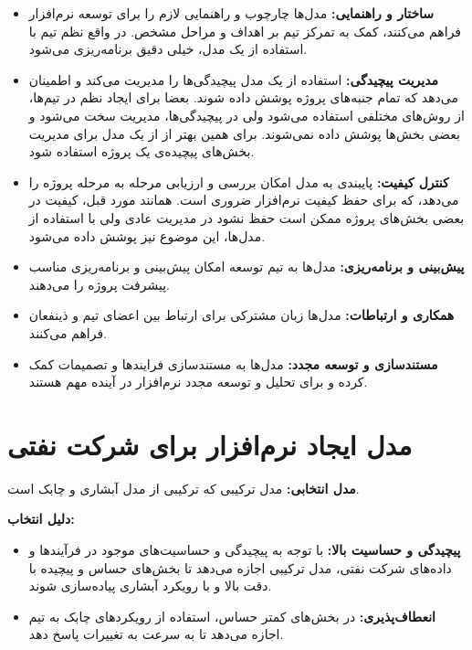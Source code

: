 \begin{itemize}
	\item \textbf{ساختار و راهنمایی:}
	مدل‌ها چارچوب و راهنمایی لازم را برای توسعه نرم‌افزار فراهم می‌کنند، کمک به تمرکز تیم بر اهداف و مراحل مشخص. در واقع نظم تیم با استفاده از یک مدل، خیلی دقیق برنامه‌ریزی می‌شود.
	\item \textbf{مدیریت پیچیدگی:}
	استفاده از یک مدل پیچیدگی‌ها را مدیریت می‌کند و اطمینان می‌دهد که تمام جنبه‌های پروژه پوشش داده شوند. بعضا برای ایجاد نظم در تیم‌ها، از روش‌های مختلفی استفاده می‌شود ولی در پیچیدگی‌ها، مدیریت سخت می‌شود و بعضی بخش‌ها پوشش داده نمی‌شوند. برای همین بهتر از از یک مدل برای مدیریت بخش‌های پیچیده‌ی یک پروژه استفاده شود.
	\item \textbf{کنترل کیفیت:}
	پایبندی به مدل امکان بررسی و ارزیابی مرحله به مرحله پروژه را می‌دهد، که برای حفظ کیفیت نرم‌افزار ضروری است. همانند مورد قبل، کیفیت در بعضی بخش‌های پروژه ممکن است حفظ نشود در مدیریت عادی ولی با استفاده از مدل‌ها، این موضوع نیز پوشش داده می‌شود.
	\item \textbf{پیش‌بینی و برنامه‌ریزی:}
	مدل‌ها به تیم توسعه امکان پیش‌بینی و برنامه‌ریزی مناسب پیشرفت پروژه را می‌دهند.
	\item \textbf{همکاری و ارتباطات:}
	مدل‌ها زبان مشترکی برای ارتباط بین اعضای تیم و ذینفعان فراهم می‌کنند.
	\item \textbf{مستندسازی و توسعه مجدد:}
	مدل‌ها به مستندسازی فرایندها و تصمیمات کمک کرده و برای تحلیل و توسعه مجدد نرم‌افزار در آینده مهم هستند.
\end{itemize}

\section*{ مدل ایجاد نرم‌افزار برای شرکت نفتی}
\textbf{مدل انتخابی:}
مدل ترکیبی
که ترکیبی از مدل آبشاری و چابک است.

\textbf{دلیل انتخاب:}

\begin{itemize}
	\item \textbf{پیچیدگی و حساسیت بالا:}
	 با توجه به پیچیدگی و حساسیت‌های موجود در فرآیندها و داده‌های شرکت نفتی، مدل ترکیبی اجازه می‌دهد تا بخش‌های حساس و پیچیده با دقت بالا و با رویکرد آبشاری پیاده‌سازی شوند.
	\item \textbf{انعطاف‌پذیری:}
	در بخش‌های کمتر حساس، استفاده از رویکردهای چابک به تیم اجازه می‌دهد تا به سرعت به تغییرات پاسخ دهد.
\end{itemize}

